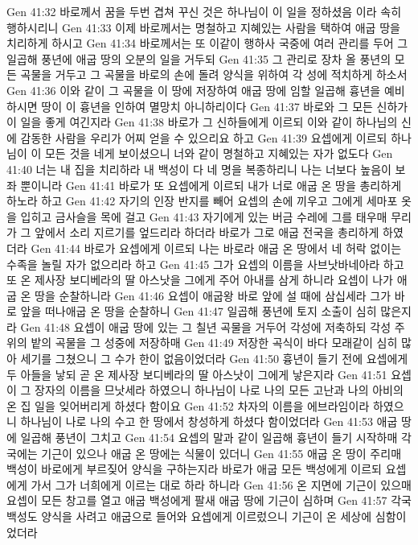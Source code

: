 Gen 41:32  바로께서 꿈을 두번 겹쳐 꾸신 것은 하나님이 이 일을 정하셨음 이라 속히 행하시리니
Gen 41:33  이제 바로께서는 명철하고 지혜있는 사람을 택하여 애굽 땅을 치리하게 하시고
Gen 41:34  바로께서는 또 이같이 행하사 국중에 여러 관리를 두어 그 일곱해 풍년에 애굽 땅의 오분의 일을 거두되
Gen 41:35  그 관리로 장차 올 풍년의 모든 곡물을 거두고 그 곡물을 바로의 손에 돌려 양식을 위하여 각 성에 적치하게 하소서
Gen 41:36  이와 같이 그 곡물을 이 땅에 저장하여 애굽 땅에 임할 일곱해 흉년을 예비하시면 땅이 이 흉년을 인하여 멸망치 아니하리이다
Gen 41:37  바로와 그 모든 신하가 이 일을 좋게 여긴지라
Gen 41:38  바로가 그 신하들에게 이르되 이와 같이 하나님의 신에 감동한 사람을 우리가 어찌 얻을 수 있으리요 하고
Gen 41:39  요셉에게 이르되 하나님이 이 모든 것을 네게 보이셨으니 너와 같이 명철하고 지혜있는 자가 없도다
Gen 41:40  너는 내 집을 치리하라 내 백성이 다 네 명을 복종하리니 나는 너보다 높음이 보좌 뿐이니라
Gen 41:41  바로가 또 요셉에게 이르되 내가 너로 애굽 온 땅을 총리하게 하노라 하고
Gen 41:42  자기의 인장 반지를 빼어 요셉의 손에 끼우고 그에게 세마포 옷을 입히고 금사슬을 목에 걸고
Gen 41:43  자기에게 있는 버금 수레에 그를 태우매 무리가 그 앞에서 소리 지르기를 엎드리라 하더라 바로가 그로 애굽 전국을 총리하게 하였더라
Gen 41:44  바로가 요셉에게 이르되 나는 바로라 애굽 온 땅에서 네 허락 없이는 수족을 놀릴 자가 없으리라 하고
Gen 41:45  그가 요셉의 이름을 사브낫바네아라 하고 또 온 제사장 보디베라의 딸 아스낫을 그에게 주어 아내를 삼게 하니라 요셉이 나가 애굽 온 땅을 순찰하니라
Gen 41:46  요셉이 애굽왕 바로 앞에 설 때에 삼십세라 그가 바로 앞을 떠나애굽 온 땅을 순찰하니
Gen 41:47  일곱해 풍년에 토지 소출이 심히 많은지라
Gen 41:48  요셉이 애굽 땅에 있는 그 칠년 곡물을 거두어 각성에 저축하되 각성 주위의 밭의 곡물을 그 성중에 저장하매
Gen 41:49  저장한 곡식이 바다 모래같이 심히 많아 세기를 그쳤으니 그 수가 한이 없음이었더라
Gen 41:50  흉년이 들기 전에 요셉에게 두 아들을 낳되 곧 온 제사장 보디베라의 딸 아스낫이 그에게 낳은지라
Gen 41:51  요셉이 그 장자의 이름을 므낫세라 하였으니 하나님이 나로 나의 모든 고난과 나의 아비의 온 집 일을 잊어버리게 하셨다 함이요
Gen 41:52  차자의 이름을 에브라임이라 하였으니 하나님이 나로 나의 수고 한 땅에서 창성하게 하셨다 함이었더라
Gen 41:53  애굽 땅에 일곱해 풍년이 그치고
Gen 41:54  요셉의 말과 같이 일곱해 흉년이 들기 시작하매 각국에는 기근이 있으나 애굽 온 땅에는 식물이 있더니
Gen 41:55  애굽 온 땅이 주리매 백성이 바로에게 부르짖어 양식을 구하는지라 바로가 애굽 모든 백성에게 이르되 요셉에게 가서 그가 너희에게 이르는 대로 하라 하니라
Gen 41:56  온 지면에 기근이 있으매 요셉이 모든 창고를 열고 애굽 백성에게 팔새 애굽 땅에 기근이 심하며
Gen 41:57  각국 백성도 양식을 사려고 애굽으로 들어와 요셉에게 이르렀으니 기근이 온 세상에 심함이었더라
